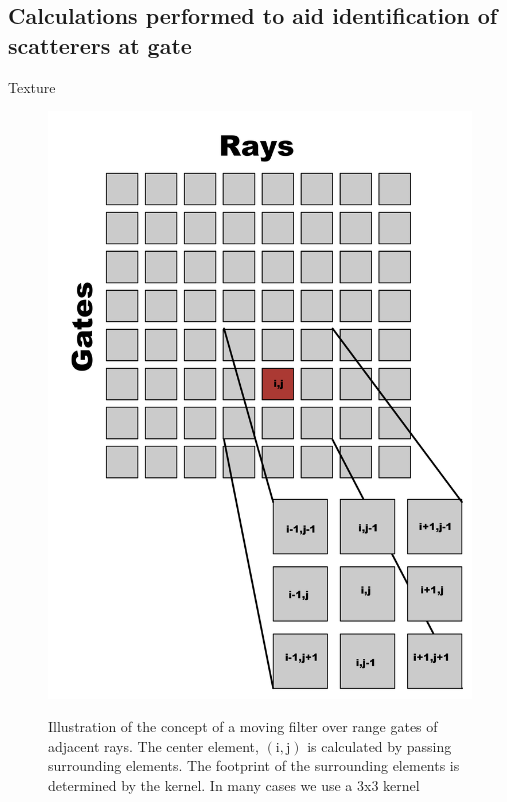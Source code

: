 \documentclass[twocol]{ametsoc}
\begin{document}
\subsection{Calculations performed to aid identification of scatterers at gate}
Texture 
\begin{figure}[h]
    \centering
    \includegraphics[width=0.6\columnwidth]{grid.png}
    \label{fig:grid}
    \caption{Illustration of the concept of a moving filter over range gates of adjacent rays. The center element, $\mathrm{(i,j)}$ is calculated by passing surrounding elements. The footprint of the surrounding elements is determined by the kernel. In many cases we use a 3x3 kernel}
\end{figure}
\end{document}
